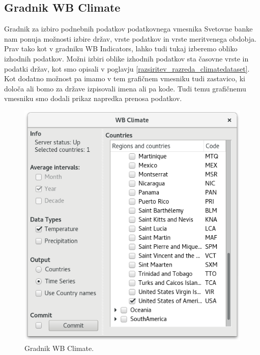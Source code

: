 \subsection{Gradnik WB Climate}

Gradnik za izbiro podnebnih podatkov podatkovnega vmesnika Svetovne banke nam
ponuja možnosti izbire držav, vrste podatkov in vrste meritvenega obdobja.
Prav tako kot v gradniku WB Indicators, lahko tudi tukaj izberemo obliko izhodnih
podatkov. Možni izbiri oblike izhodnih podatkov sta časovne vrste in podatki
držav, kot smo opisali v poglavju \ref{razsiritev_razreda_climatedataset}. 
Kot dodatno možnost pa imamo v tem grafičnem vmesniku tudi zastavico, ki 
določa ali bomo za države izpisovali imena ali pa kode. Tudi temu grafičnemu
vmesniku smo dodali prikaz napredka prenosa podatkov.



\begin{figure}
\begin{center}
\includegraphics[width=13.75cm]{pic/co2_temp_climate_selection.png}
\end{center}
\caption{Gradnik WB Climate.}
\label{co2_temp_climate}
\end{figure} 

